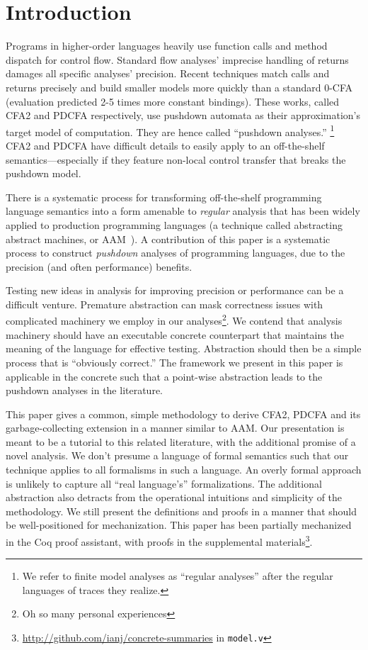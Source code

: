 
\section{Introduction}

Programs in higher-order languages heavily use function calls and method dispatch for control flow.
%
Standard flow analyses' imprecise handling of returns damages all specific analyses' precision.
%
Recent techniques match calls and returns precisely \citep{ianjohnson:vardoulakis-lmcs11, dvanhorn:Earl2010Pushdown} and build smaller models more quickly than a standard 0-CFA (evaluation predicted 2-5 times more constant bindings).
%
These works, called CFA2 and PDCFA respectively, use pushdown automata as their approximation's target model of computation.
%
They are hence called ``pushdown analyses.''%
%
\footnote{We refer to finite model analyses as ``regular analyses'' after the regular languages of traces they realize.}
%
CFA2 and PDCFA have difficult details to easily apply to an off-the-shelf semantics---especially if they feature non-local control transfer that breaks the pushdown model.

There is a systematic process for transforming off-the-shelf programming language semantics into a form amenable to \emph{regular} analysis that has been widely applied to production programming languages (a technique called abstracting abstract machines, or AAM~\citep{dvanhorn:VanHorn2010Abstracting}).
%
A contribution of this paper is a systematic process to construct \emph{pushdown} analyses of programming languages, due to the precision (and often performance) benefits.
%


Testing new ideas in analysis for improving precision or performance can be a difficult venture.
%
Premature abstraction can mask correctness issues with complicated machinery we employ in our analyses\footnote{Oh so many personal experiences}.
%
We contend that analysis machinery should have an executable concrete counterpart that maintains the meaning of the language for effective testing.
%
Abstraction should then be a simple process that is ``obviously correct.''
%
The framework we present in this paper is applicable in the concrete such that a point-wise abstraction leads to the pushdown analyses in the literature.

This paper gives a common, simple methodology to derive CFA2, PDCFA and its garbage-collecting extension in a manner similar to AAM.
%
Our presentation is meant to be a tutorial to this related literature, with the additional promise of a novel analysis.
%
We don't presume a language of formal semantics such that our technique applies to all formalisms in such a language.
%
An overly formal approach is unlikely to capture all ``real language's'' formalizations.
%
The additional abstraction also detracts from the operational intuitions and simplicity of the methodology.
%
We still present the definitions and proofs in a manner that should be well-positioned for mechanization.
%
This paper has been partially mechanized in the Coq proof assistant, with proofs in the supplemental materials\footnote{\url{http://github.com/ianj/concrete-summaries} in \texttt{model.v}}.

